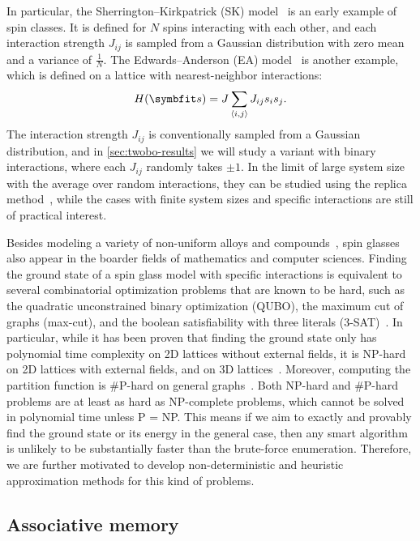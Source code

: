 In particular, the Sherrington--Kirkpatrick (SK) model~\cite{sherrington1975solvable} is an early example of spin classes. It is defined for $N$ spins interacting with each other, and each interaction strength $J_{i j}$ is sampled from a Gaussian distribution with zero mean and a variance of $\frac{1}{N}$. The Edwards--Anderson (EA) model~\cite{edwards1975theory} is another example, which is defined on a lattice with nearest-neighbor interactions:
\begin{equation}
H(\vs) = J \sum_{\langle i, j \rangle} J_{i j} s_i s_j.
\end{equation}
The interaction strength $J_{i j}$ is conventionally sampled from a Gaussian distribution, and in \cref{sec:twobo-results} we will study a variant with binary interactions, where each $J_{i j}$ randomly takes $\pm 1$. In the limit of large system size with the average over random interactions, they can be studied using the replica method~\cite{parisi1979infinite}, while the cases with finite system sizes and specific interactions are still of practical interest.

Besides modeling a variety of non-uniform alloys and compounds~\cite{mydosh2015spin}, spin glasses also appear in the boarder fields of mathematics and computer sciences. Finding the ground state of a spin glass model with specific interactions is equivalent to several combinatorial optimization problems that are known to be hard, such as the quadratic unconstrained binary optimization (QUBO), the maximum cut of graphs (max-cut), and the boolean satisfiability with three literals (3-SAT)~\cite{karp1972reducibility}. In particular, while it has been proven that finding the ground state only has polynomial time complexity on 2D lattices without external fields, it is NP-hard on 2D lattices with external fields, and on 3D lattices~\cite{barahona1982computational}. Moreover, computing the partition function is \#P-hard on general graphs~\cite{galanis2016inapproximability, fefferman2017exact, peters2020location}. Both NP-hard and \#P-hard problems are at least as hard as NP-complete problems, which cannot be solved in polynomial time unless P = NP. This means if we aim to exactly and provably find the ground state or its energy in the general case, then any smart algorithm is unlikely to be substantially faster than the brute-force enumeration. Therefore, we are further motivated to develop non-deterministic and heuristic approximation methods for this kind of problems.

\subsection{Associative memory}
\label{sec:hopfield}

